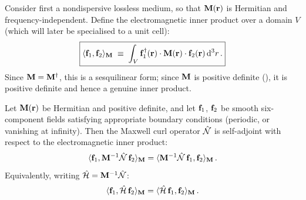 Consider first a nondispersive lossless medium, so that $\mathbf{M}(\mathbf{r})$
is Hermitian and frequency-independent.  Define the electromagnetic
inner product over a domain $V$ (which will later be specialised to a
unit cell):
\begin{equation}\label{eq:ch3-em-ip}
  \boxed{%
  \emip{\emfield_1}{\emfield_2}
  \;\equiv\;
  \int_V \emfield_1^\dagger(\rvec)\cdot\Mmat(\rvec)
         \cdot\emfield_2(\rvec)\,\dd^3r\,.}
\end{equation}
Since $\mathbf{M}=\mathbf{M}^\dagger$, this is a sesquilinear form; since $\mathbf{M}$
is positive definite (), it is
positive definite and hence a genuine inner product.

\begin{theorem}
  \label{thm:ch3-self-adjoint}
  Let $\mathbf{M}(\mathbf{r})$ be Hermitian and positive definite, and let
  $\mathbf{f}_1$, $\mathbf{f}_2$ be smooth six-component fields satisfying
  appropriate boundary conditions (periodic, or vanishing at infinity).
  Then the Maxwell curl operator $\hat{\mathcal{N}}$ is self-adjoint with respect
  to the electromagnetic inner product:
  \begin{equation}\label{eq:ch3-self-adj-statement}
    \langle \mathbf{f}_1 , \mathbf{M}^{-1}\hat{\mathcal{N}}\,\mathbf{f}_2 \rangle_{\mathbf{M}}
    = \langle \mathbf{M}^{-1}\hat{\mathcal{N}}\,\mathbf{f}_1 , \mathbf{f}_2 \rangle_{\mathbf{M}}\,.
  \end{equation}
  Equivalently, writing $\hat{\mathcal{H}}=\mathbf{M}^{-1}\hat{\mathcal{N}}$:
  \begin{equation}\label{eq:ch3-H-self-adj}
    \langle \mathbf{f}_1 , \hat{\mathcal{H}}\,\mathbf{f}_2 \rangle_{\mathbf{M}}
    = \langle \hat{\mathcal{H}}\,\mathbf{f}_1 , \mathbf{f}_2 \rangle_{\mathbf{M}}\,.
  \end{equation}
\end{theorem}

